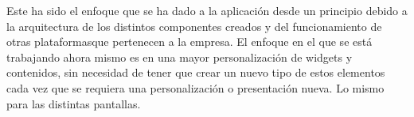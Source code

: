  Este ha sido el enfoque que se ha dado a la aplicación desde un principio debido a la arquitectura de los distintos
 componentes creados y del funcionamiento de otras plataformasque pertenecen a la empresa. El enfoque en el que se está 
 trabajando ahora mismo es en una mayor personalización de widgets y contenidos, sin necesidad de tener que crear un nuevo
 tipo de estos elementos cada vez que se requiera una personalización o presentación nueva. Lo mismo para las distintas
 pantallas. 
